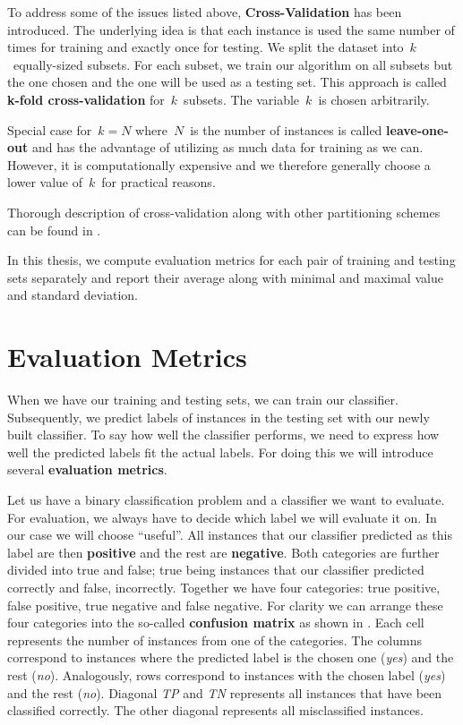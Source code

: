 To address some of the issues listed above, {\bf Cross-Validation} has been introduced.
The underlying idea is that each instance is used the same number of times for training 
and exactly once for testing.
We split the dataset into~$k$~equally-sized subsets.
For each subset, we train our algorithm on all subsets but the one chosen 
and the one will be used as a testing set.
This approach is called {\bf k-fold cross-validation} for~$k$~subsets.
The variable~$k$~is chosen arbitrarily.

Special case for~$k=N$ where~$N$~is the number of instances is called {\bf leave-one-out}
and has the advantage of 
utilizing as much data for training as we can.
However, it is computationally expensive and
we therefore generally choose a lower value of~$k$~for practical reasons.

Thorough description of cross-validation along with other partitioning schemes
can be found in \citet{arlot2010}.

In this thesis, we compute evaluation metrics for each pair of training and testing sets separately
and report their average along with minimal and maximal value and standard deviation.


\section{Evaluation Metrics}

When we have our training and testing sets, we can train our classifier.
Subsequently, we predict labels of instances in the testing set with our newly
built classifier.
To say how well the classifier performs, we need to express how well the predicted
labels fit the actual labels.
For doing this we will introduce several {\bf evaluation metrics}.

Let us have a binary classification problem and a classifier we want to evaluate.
For evaluation, we always have to decide which label we will evaluate it on.
In our case we will choose ``useful''.
All instances that our classifier predicted as this label are then {\bf positive} 
and the rest are {\bf negative}.
Both categories are further divided into true and false;
true being instances that our classifier predicted correctly and false, incorrectly.
Together we have four categories:
true positive, false positive, true negative and false negative.
For clarity we can arrange these four categories into the so-called {\bf confusion matrix} 
as shown in .
Each cell represents the number of instances from one of the categories.
The columns correspond to instances where the predicted label is the chosen one (\textit{yes}) and the rest (\textit{no}).
Analogously, rows correspond to instances with the chosen label (\textit{yes}) and the rest (\textit{no}).
Diagonal {\it TP} and {\it TN} represents all instances that have been classified correctly.
The other diagonal represents all misclassified instances.



